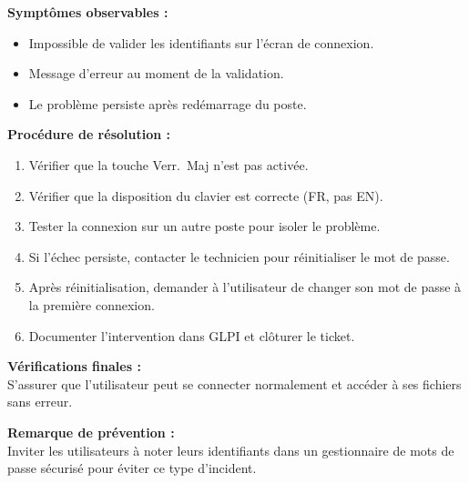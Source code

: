 \documentclass[a4paper,11pt]{article}
\begin{document}
\vspace{0.5em}
\noindent\textbf{Symptômes observables :}
\begin{itemize}
    \item Impossible de valider les identifiants sur l'écran de connexion.
    \item Message d'erreur au moment de la validation.
    \item Le problème persiste après redémarrage du poste.
\end{itemize}

\vspace{0.5em}
\noindent\textbf{Procédure de résolution :}
\begin{enumerate}
    \item Vérifier que la touche Verr.\ Maj n'est pas activée.
    \item Vérifier que la disposition du clavier est correcte (FR, pas EN).
    \item Tester la connexion sur un autre poste pour isoler le problème.
    \item Si l'échec persiste, contacter le technicien pour réinitialiser le mot de passe.
    \item Après réinitialisation, demander à l'utilisateur de changer son mot de passe à la première connexion.
    \item Documenter l'intervention dans GLPI et clôturer le ticket.
\end{enumerate}

\vspace{0.5em}
\noindent\textbf{Vérifications finales :}\\
S'assurer que l'utilisateur peut se connecter normalement et accéder à ses fichiers sans erreur.

\vspace{0.5em}
\noindent\textbf{Remarque de prévention :}\\
Inviter les utilisateurs à noter leurs identifiants dans un gestionnaire de mots de passe sécurisé pour éviter ce type d'incident.
\end{document}

